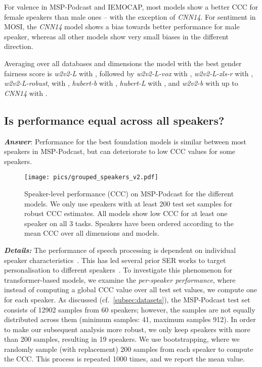 \documentclass{article}
\newcommand\cnn{\mbox{\emph{CNN14}}}
\newcommand\wbase{\mbox{\emph{w2v2-b}}}
\newcommand\hbase{\mbox{\emph{hubert-b}}}
\newcommand\wlarge{\mbox{\emph{w2v2-L}}}
\newcommand\hlarge{\mbox{\emph{hubert-L}}}
\newcommand\wrobust{\mbox{\emph{w2v2-L-robust}}}
\newcommand\wvox{\mbox{\emph{w2v2-L-vox}}}
\newcommand\wxlsr{\mbox{\emph{w2v2-L-xls-r}}}
\newcommand\msppodcast{\mbox{MSP-Podcast}}
\newcommand\iemocap{\mbox{IEMOCAP}}
\newcommand\mosi{\mbox{MOSI}}
\newcommand{\cf}{{cf.\ }}
\begin{document}
For valence in {\msppodcast} and {\iemocap}, 
most models show a better \ac{CCC} for female speakers than male ones -- 
with the exception of {\cnn}. 
For sentiment in {\mosi}, the {\cnn} model shows a bias towards better performance for male speaker,
whereas all other models show very small biases in the different direction.

Averaging over all databases and dimensions the model with the best gender fairness score is {\wlarge} with , followed by {\wvox} with , {\wxlsr} with , {\wrobust}, with , {\hbase} with , {\hlarge} with , and {\wbase} with  up to {\cnn} with .





\subsection{Is performance equal across all speakers?}
\label{subsec:speakers}

\emph{\textbf{Answer}}:
Performance for the best foundation models is similar between most speakers in {\msppodcast},
but can deteriorate to low \ac{CCC} values for some speakers.

\begin{figure}[t]
    \centering
    \texttt{[image: pics/grouped\_speakers\_v2.pdf]}
    \caption{
        Speaker-level performance (\acs{CCC}) on {\msppodcast} for the different models.
        We only use speakers with at least 200 test set samples for robust \acs{CCC} estimates.
        All models show low \ac{CCC} for at least one speaker on all 3 tasks.
        Speakers have been ordered according to the mean \acs{CCC} over all dimensions and models.
    }
    \label{fig:speaker:plots}
\end{figure}

\noindent
\emph{\textbf{Details:}}
The performance of speech processing is dependent on individual speaker characteristics~\citep{doddington1998sheep}.
This has led several prior \ac{SER} works to target personalisation to different speakers~\citep{rudovic2018personalized, triantafyllopoulos2021deep, sridhar2022unsupervised}.
To investigate this phenomenon for transformer-based models, we examine the \emph{per-speaker performance}, where instead of computing a global \ac{CCC} value over all test set values, we compute one for each speaker.
As discussed (\cf \cref{subsec:datasets}), the {\msppodcast} test set consists of 12902 samples from 60 speakers; however, the samples are not equally distributed across them (minimum samples: 41, maximum samples 912).
In order to make our subsequent analysis more robust, we only keep speakers with more than 200 samples, resulting in 19 speakers.
We use bootstrapping, where we randomly sample (with replacement) 200 samples from each speaker to compute the \ac{CCC}.
This process is repeated 1000 times, and we report the mean value.
\end{document}
